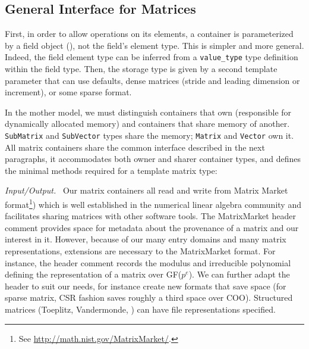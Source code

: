 \subsection{General Interface for %
Matrices}
%
First, in order to allow operations on its elements, a container is
parameterized by a field object (), not the field's element
type. This is simpler and more general.
Indeed, the field element type can be inferred from a
\verb!value_type! type definition within the field type.
Then, the storage type is given by a second
template parameter that can use defaults,
\eg dense \blas matrices (stride
and leading dimension or increment), or some sparse format.
%

%
In the mother model, we must distinguish containers that own (responsible for
dynamically allocated memory) and containers that share memory of another.
\texttt{SubMatrix} and \texttt{SubVector} types share the memory;
\texttt{Matrix} and \texttt{Vector} own it.
%
All matrix containers share the common \applin  interface
described in the next paragraphs, it accommodates both owner and sharer
container types, and defines the minimal methods required for a
template \applin matrix type:
%
% 
%
%
\def\monitem#1{\par\textit{#1}\ }
\monitem{Input/Output.}
		Our matrix containers all read and write from Matrix Market
		format\footnote{See \url{http://math.nist.gov/MatrixMarket/}.})
		which is well established in the numerical linear algebra
		community and facilitates sharing matrices
		with other software tools.  The MatrixMarket header comment provides space for
		metadata about the provenance of a matrix and our interest in
		it.  However, because of our many entry
		domains and many matrix representations,
		extensions are necessary to the MatrixMarket format.
		For instance, the header comment records the modulus and
		irreducible polynomial defining the representation of a matrix over
		GF($p^e$).
We can further adapt the header to suit our needs, for instance
create new formats that save space (for sparse matrix, CSR fashion saves
roughly a third space over COO). Structured matrices
(Toeplitz, Vandermonde, \etc)
can have file representations specified.
%
